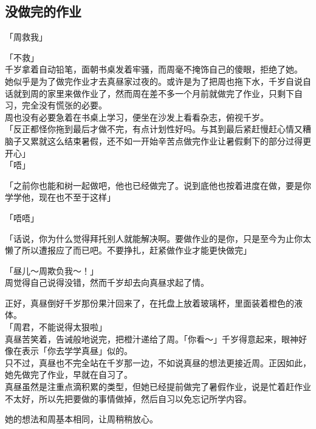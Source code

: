 \subsection{没做完的作业}

「周救我」

「不救」\\

千岁拿着自动铅笔，面朝书桌发着牢骚，而周毫不掩饰自己的傻眼，拒绝了她。\\

她似乎是为了做完作业才去真昼家过夜的。或许是为了把周也拖下水，千岁自说自话就到周的家里来做作业了，然而周在差不多一个月前就做完了作业，只剩下自习，完全没有慌张的必要。\\

周也没有必要急着在书桌上学习，便坐在沙发上看看杂志，俯视千岁。\\

「反正都怪你拖到最后才做不完，有点计划性好吗。与其到最后紧赶慢赶心情又糟脑子又累就这么结束暑假，还不如一开始辛苦点做完作业让暑假剩下的部分过得更开心」\\

「唔」

「之前你也能和树一起做吧，他也已经做完了。说到底他也按着进度在做，要是你学学他，现在也不至于这样」

「唔唔」

「话说，你为什么觉得拜托别人就能解决啊。要做作业的是你，只是至今为止你太懒了所以遭报应了而已吧。不要挣扎，赶紧做作业才能更快做完」

「昼儿～周欺负我～！」\\

周觉得自己说得没错，然而千岁却去向真昼求起了情。

正好，真昼倒好千岁那份果汁回来了，在托盘上放着玻璃杯，里面装着橙色的液体。\\

「周君，不能说得太狠啦」\\

真昼苦笑着，告诫般地说完，把橙汁递给了周。「你看～」千岁得意起来，眼神好像在表示「你去学学真昼」似的。\\

只不过，真昼也不完全站在千岁那一边，不如说真昼的想法更接近周。正因如此，她先做完了作业，早就在自习了。\\

真昼虽然是注重点滴积累的类型，但她已经提前做完了暑假作业，说是忙着赶作业不太好，所以先把要做的事情做掉，然后自习以免忘记所学内容。

她的想法和周基本相同，让周稍稍放心。\\

